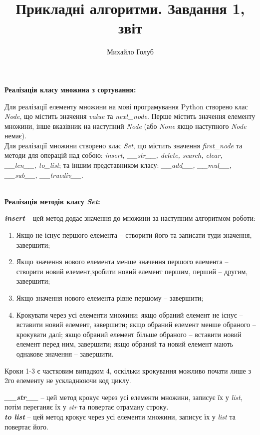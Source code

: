 \documentclass{article}
\title{Прикладні алгоритми. Завдання 1, звіт}
\author{Михайло Голуб}
\begin{document}
\maketitle
\newpage
\textbf{Реалізація класу множина з сортування:}
\\\indent

Для реалізації елементу множини на мові програмування Python створено клас \textit{Node}, що містить значення \textit{value} та \textit{next\_node}. Перше містить значення елементу множини, інше вказівник на наступний \textit{Node} (або \textit{None} якщо наступного \textit{Node} немає).\\\indent
Для реалізації множини створено клас \textit{Set}, що містить значення \textit{first\_node} та методи для операцій над собою: \textit{insert, \_\_str\_\_, delete, search, clear, \_\_len\_\_, to\_list}; та іншим представником класу: \textit{\_\_add\_\_, \_\_mul\_\_, \_\_sub\_\_, \_\_truediv\_\_}.
\\\\\indent


\textbf{Реалізація методів класу \textit{Set}:}
\\\indent

\textbf{\textit{insert}} -- цей метод додає значення до множини за наступним алгоритмом роботи:
\begin{enumerate}
\item Якщо не існує першого елемента -- створити його та записати туди значення, завершити;
\item Якщо значення нового елемента менше значення першого елемента -- створити новий елемент,зробити новий елемент першим, перший -- другим, завершити;
\item Якщо значення нового елемента рівне першому -- завершити;
\item Крокувати через усі елементи множини: якщо обраний елемент не існує -- вставити новий елемент, завершити; якщо обраний елемент менше обраного -- крокувати далі; якщо обраний елемент більше обраного -- вставити новий елемент перед ним, завершити; якщо обраний та новий елемент мають однакове значення -- завершити.
\end{enumerate}
Кроки 1-3 є частковим випадком 4, оскільки крокування можливо почати лише з 2го елементу не ускладнюючи код циклу.\\\indent

\textbf{\textit{\_\_str\_\_}} -- цей метод крокує через усі елементи множини, записує їх у \textit{list}, потім переганяє їх у \textit{str} та повертає отраману строку.\\\indent
\textbf{\textit{to list}} -- цей метод крокує через усі елементи множини, записує їх у \textit{list} та повертає його.\\\indent
\end{document}
